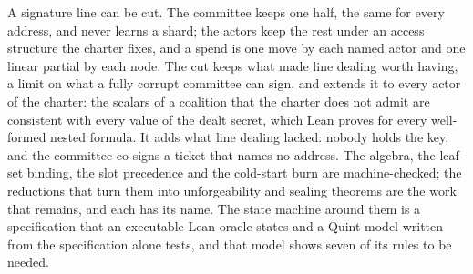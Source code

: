 A signature line can be cut. The committee keeps one half, the same for every address, and never learns a shard; the actors keep the rest under an access structure the charter fixes, and a spend is one move by each named actor and one linear partial by each node. The cut keeps what made line dealing worth having, a limit on what a fully corrupt committee can sign, and extends it to every actor of the charter: the scalars of a coalition that the charter does not admit are consistent with every value of the dealt secret, which Lean proves for every well-formed nested formula. It adds what line dealing lacked: nobody holds the key, and the committee co-signs a ticket that names no address. The algebra, the leaf-set binding, the slot precedence and the cold-start burn are machine-checked; the reductions that turn them into unforgeability and sealing theorems are the work that remains, and each has its name. The state machine around them is a specification that an executable Lean oracle states and a Quint model written from the specification alone tests, and that model shows seven of its rules to be needed.
